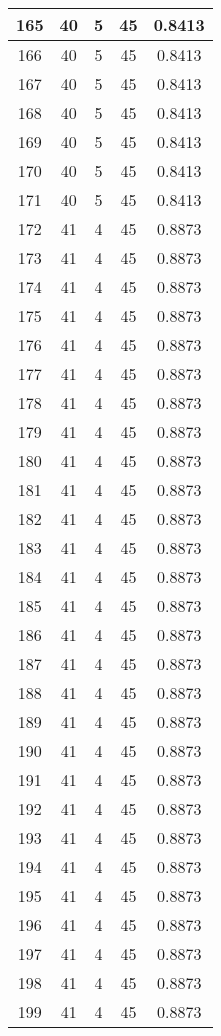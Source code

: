 \documentclass[letterpaper, 12pt]{article}
\begin{document}
\begin{longtable}{|c|c|c|c|c|}
\hline
165 & 40 & 5 & 45 & 0.8413 \\
\hline
166 & 40 & 5 & 45 & 0.8413 \\
\hline
167 & 40 & 5 & 45 & 0.8413 \\
\hline
168 & 40 & 5 & 45 & 0.8413 \\
\hline
169 & 40 & 5 & 45 & 0.8413 \\
\hline
170 & 40 & 5 & 45 & 0.8413 \\
\hline
171 & 40 & 5 & 45 & 0.8413 \\
\hline
172 & 41 & 4 & 45 & 0.8873 \\
\hline
173 & 41 & 4 & 45 & 0.8873 \\
\hline
174 & 41 & 4 & 45 & 0.8873 \\
\hline
175 & 41 & 4 & 45 & 0.8873 \\
\hline
176 & 41 & 4 & 45 & 0.8873 \\
\hline
177 & 41 & 4 & 45 & 0.8873 \\
\hline
178 & 41 & 4 & 45 & 0.8873 \\
\hline
179 & 41 & 4 & 45 & 0.8873 \\
\hline
180 & 41 & 4 & 45 & 0.8873 \\
\hline
181 & 41 & 4 & 45 & 0.8873 \\
\hline
182 & 41 & 4 & 45 & 0.8873 \\
\hline
183 & 41 & 4 & 45 & 0.8873 \\
\hline
184 & 41 & 4 & 45 & 0.8873 \\
\hline
185 & 41 & 4 & 45 & 0.8873 \\
\hline
186 & 41 & 4 & 45 & 0.8873 \\
\hline
187 & 41 & 4 & 45 & 0.8873 \\
\hline
188 & 41 & 4 & 45 & 0.8873 \\
\hline
189 & 41 & 4 & 45 & 0.8873 \\
\hline
190 & 41 & 4 & 45 & 0.8873 \\
\hline
191 & 41 & 4 & 45 & 0.8873 \\
\hline
192 & 41 & 4 & 45 & 0.8873 \\
\hline
193 & 41 & 4 & 45 & 0.8873 \\
\hline
194 & 41 & 4 & 45 & 0.8873 \\
\hline
195 & 41 & 4 & 45 & 0.8873 \\
\hline
196 & 41 & 4 & 45 & 0.8873 \\
\hline
197 & 41 & 4 & 45 & 0.8873 \\
\hline
198 & 41 & 4 & 45 & 0.8873 \\
\hline
199 & 41 & 4 & 45 & 0.8873 \\
\hline
\end{longtable}
\end{document}
